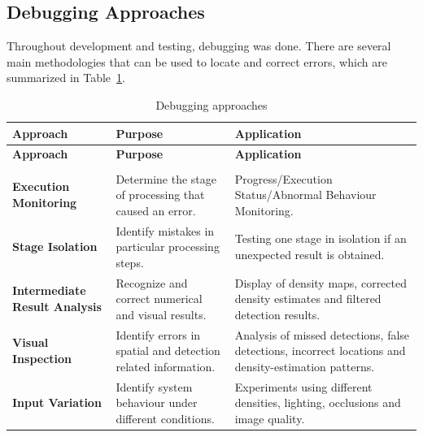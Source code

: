 \subsection{Debugging Approaches}

Throughout development and testing, debugging was done. There are several main methodologies that can be used to locate and correct errors, which are summarized in Table~\ref{tab:debugging-approaches}.


\begin{longtable}{|>{\raggedright\arraybackslash}p{3.3cm}|>{\raggedright\arraybackslash}p{4.8cm}|>{\raggedright\arraybackslash}p{5.9cm}|}

\caption{Debugging approaches}
\label{tab:debugging-approaches} \\

\hline
\textbf{Approach} & \textbf{Purpose} & \textbf{Application} \\
\hline
\endfirsthead

\hline
\textbf{Approach} & \textbf{Purpose} & \textbf{Application} \\
\hline
\endhead

\hline
\multicolumn{3}{l}{\textit{Continued on next page}} \\
\endfoot

\hline
\endlastfoot

\textbf{Execution Monitoring}
&
Determine the stage of processing that caused an error.
&
Progress/Execution Status/Abnormal Behaviour Monitoring.
\\
\hline

\textbf{Stage Isolation}
&
Identify mistakes in particular processing steps.
&
Testing one stage in isolation if an unexpected result is obtained.
\\
\hline

\textbf{Intermediate Result Analysis}
&
Recognize and correct numerical and visual results.
&
Display of density maps, corrected density estimates and filtered detection results.
\\
\hline

\textbf{Visual Inspection}
&
Identify errors in spatial and detection related information.
&
Analysis of missed detections, false detections, incorrect locations and density-estimation patterns.
\\
\hline

\textbf{Input Variation}
&
Identify system behaviour under different conditions.
&
Experiments using different densities, lighting, occlusions and image quality.
\\
\hline

\end{longtable}

